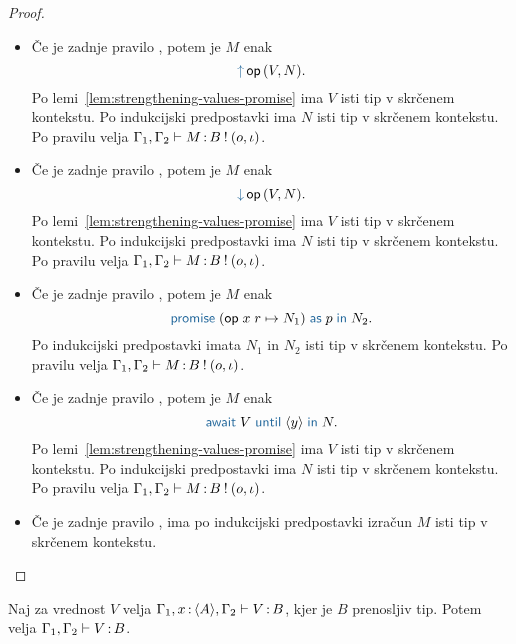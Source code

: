 \begin{proof}
\begin{itemize}
		\item Če je zadnje pravilo , potem je $M$ enak $$\tmopout{op}{V}{N}.$$
		Po lemi~\ref{lem:strengthening-values-promise} ima $V$ isti tip v skrčenem kontekstu.
		Po indukcijski predpostavki ima $N$ isti tip v skrčenem kontekstu.
		Po pravilu  velja $\Gamma_1, \Gamma_2 \vdash M \mathinner{:} B \mathbin{!} (o, \iota)$.
		
		\item Če je zadnje pravilo , potem je $M$ enak $$\tmopin{op}{V}{N}.$$
		Po lemi~\ref{lem:strengthening-values-promise} ima $V$ isti tip v skrčenem kontekstu.
		Po indukcijski predpostavki ima $N$ isti tip v skrčenem kontekstu.
		Po pravilu  velja $\Gamma_1, \Gamma_2 \vdash M \mathinner{:} B \mathbin{!} (o, \iota)$.
		
		\item Če je zadnje pravilo , potem je $M$ enak $$\tmwithrec{op}{x}{r}{N_1}{p}{N_2}.$$
		Po indukcijski predpostavki imata $N_1$ in $N_2$ isti tip v skrčenem kontekstu.
		Po pravilu  velja $\Gamma_1, \Gamma_2 \vdash M \mathinner{:} B \mathbin{!} (o, \iota)$.
		
		\item Če je zadnje pravilo , potem je $M$ enak $$\tmawait{V}{y}{N}.$$
		Po lemi~\ref{lem:strengthening-values-promise} ima $V$ isti tip v skrčenem kontekstu.
		Po indukcijski predpostavki ima $N$ isti tip v skrčenem kontekstu.
		Po pravilu  velja $\Gamma_1, \Gamma_2 \vdash M \mathinner{:} B \mathbin{!} (o, \iota)$.
		
		\item Če je zadnje pravilo , ima po indukcijski predpostavki izračun $M$ isti tip v skrčenem kontekstu.
		
	\end{itemize}
\end{proof}


\begin{lema}\label{lem:tovor-osnovni-tip-skrcitev-2}
	Naj za vrednost $V$ velja $\Gamma_1, x \mathinner{:} \langle A \rangle, \Gamma_2 \vdash V \mathinner{:} B$, kjer je $B$ prenosljiv tip. Potem velja $\Gamma_1, \Gamma_2 \vdash V \mathinner{:} B$.
\end{lema}

